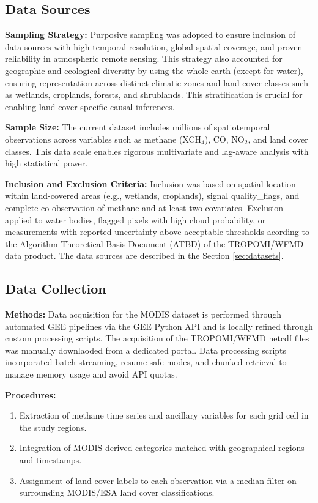 \subsection{Data Sources}

\textbf{Sampling Strategy:}
Purposive sampling was adopted to ensure inclusion of data sources with high temporal resolution, global spatial coverage, and proven reliability in atmospheric remote sensing. This strategy also accounted for geographic and ecological diversity by using the whole earth (except for water), ensuring representation across distinct climatic zones and land cover classes such as wetlands, croplands, forests, and shrublands. This stratification is crucial for enabling land cover-specific causal inferences.

\textbf{Sample Size:}
The current dataset includes millions of spatiotemporal observations across variables such as methane (XCH$_4$), CO, NO$_2$, and land cover classes. This data scale enables rigorous multivariate and lag-aware analysis with high statistical power.

\textbf{Inclusion and Exclusion Criteria:}
Inclusion was based on spatial location within land-covered areas (e.g., wetlands, croplands), signal \gls{quality_flags}, and complete co-observation of methane and at least two covariates. Exclusion applied to water bodies, flagged pixels with high cloud probability, or measurements with reported uncertainty above acceptable thresholds acording to the Algorithm Theoretical Basis Document (ATBD) of the TROPOMI/WFMD data product. The data sources are described in the Section \ref{sec:datasets}.

\subsection{Data Collection}

\textbf{Methods:}
Data acquisition for the MODIS dataset is performed through automated GEE pipelines via the GEE Python API and is locally refined through custom processing scripts. The acquisition of the TROPOMI/WFMD \gls{netcdf} files was manually downlaoded from a dedicated portal. Data processing scripts incorporated batch streaming, resume-safe modes, and chunked retrieval to manage memory usage and avoid API quotas.

\textbf{Procedures:}
\begin{enumerate}
  \item Extraction of methane time series and ancillary variables for each grid cell in the study regions.
  \item Integration of MODIS-derived categories matched with geographical regions and timestamps.
  \item Assignment of land cover labels to each observation via a median filter on surrounding MODIS/ESA land cover classifications.
\end{enumerate}

